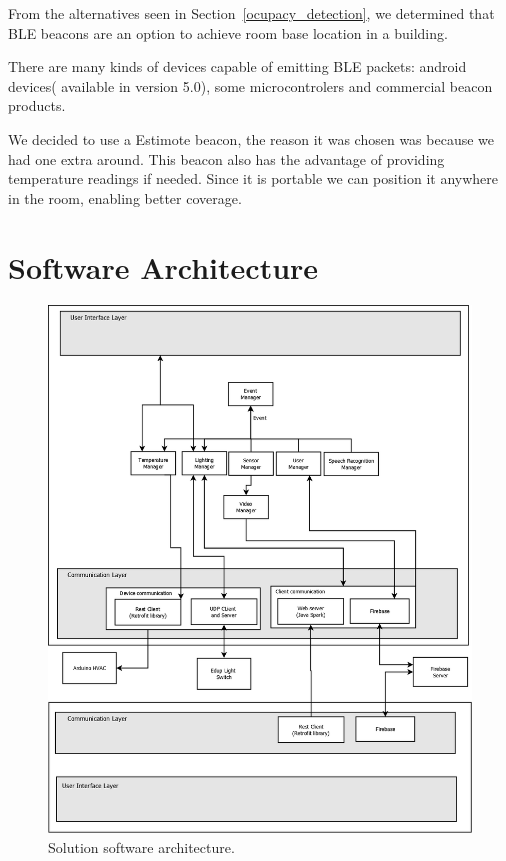From the alternatives seen in Section~\ref{ocupacy_detection}, we  determined that \ac{BLE} beacons are an option to achieve room base location in a building.

There are many kinds of devices capable of emitting \ac{BLE} packets: android devices( available in version 5.0), some microcontrolers and commercial beacon products.

We decided to use a Estimote beacon, the reason it was chosen was because we had one extra around. This beacon also has the advantage of providing temperature readings if needed. Since it is portable we can position it anywhere in the room, enabling better coverage.


\section{Software Architecture}


\begin{figure}[H]
\centering
\includegraphics[width=1\textwidth]{Figures/software_dia}
\caption{Solution software architecture.}
\label{screen_lights}
\end{figure}


